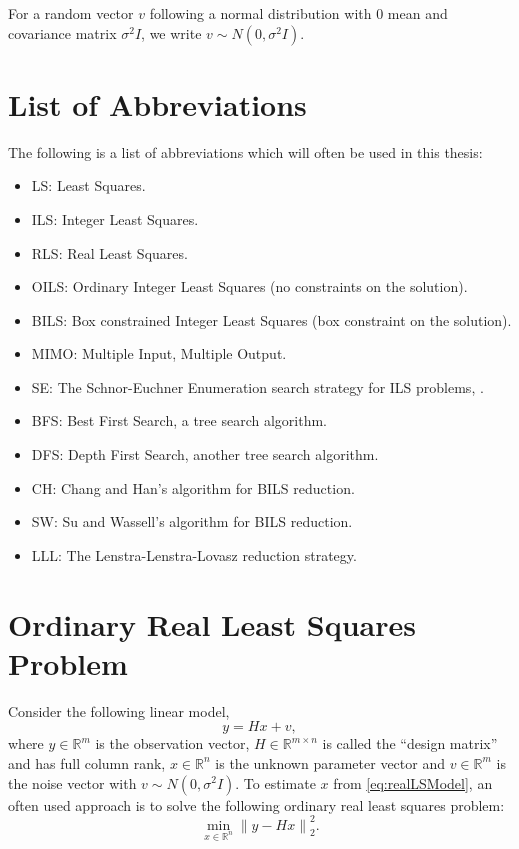 \documentclass[12pt,Bold,letterpaper]{mcgilletdclass}
\newcommand{\be}{\begin{equation}}
\newcommand{\ee}{\end{equation}}
\begin{document}
For a random vector $v$ following a normal distribution with $0$ mean and covariance matrix $\sigma^2I$, we write $v \sim N(0,\sigma^2I)$.

\section{List of Abbreviations}

The following is a list of abbreviations which will often be used in this thesis:
\begin{itemize}
\item LS: Least Squares.
\item ILS: Integer Least Squares.
\item RLS: Real Least Squares.
\item OILS: Ordinary Integer Least Squares (no constraints on the solution).
\item BILS: Box constrained Integer Least Squares (box constraint on the solution).
\item MIMO: Multiple Input, Multiple Output.
\item SE: The Schnor-Euchner Enumeration search strategy for ILS problems, \cite{SchE94}.
\item BFS: Best First Search, a tree search algorithm.
\item DFS: Depth First Search, another tree search algorithm.
\item CH: Chang and Han's algorithm for BILS reduction.
\item SW: Su and Wassell's algorithm for BILS reduction.
\item LLL: The Lenstra-Lenstra-Lovasz reduction strategy.
\end{itemize}

\section{Ordinary Real Least Squares Problem}
Consider the following linear model,
\begin{equation}
\label{eq:realLSModel}
y = Hx+v,
\end{equation}
where $y\in\mathbb{R}^m$ is the observation vector, $H\in\mathbb{R}^{m \times n}$ is called the
``design matrix'' and has full column rank, $x \in \mathbb{R}^n$ is the unknown parameter vector and $v \in \mathbb{R}^m$ is the noise vector with $v \sim N(0,\sigma^2I)$. To estimate $x$ from \eqref{eq:realLSModel}, an often used approach is to solve the following ordinary real least squares problem:
\be
\label{eq:realLSResidual}
	\min_{x \in \mathbb{R}^n} \left \| y- Hx \right \|^2_2.
\ee
\end{document}

